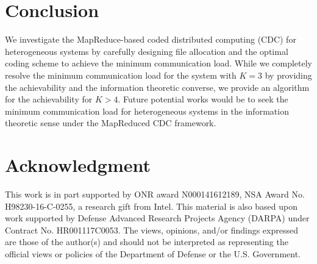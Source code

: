 \documentclass[conference]{IEEEtran}
\begin{document}
\section{Conclusion}

We investigate the MapReduce-based coded distributed computing (CDC) for heterogeneous systems by carefully designing file allocation and the optimal coding scheme to achieve the minimum communication load. While we completely resolve the minimum communication load for the system with $K=3$ by providing the achievability and the information theoretic converse, we provide an algorithm for the achievability for $K>4$. Future potential works would be to seek the minimum communication load for heterogeneous systems in the information theoretic sense under the MapReduced CDC framework.



\section{Acknowledgment}

This work is in part supported by ONR award N000141612189, NSA Award No. H98230-16-C-0255, a research gift from Intel. This material is also based upon work supported by Defense Advanced Research Projects Agency (DARPA) under Contract No. HR001117C0053. The views, opinions, and/or findings expressed are those of the author(s) and should not be interpreted as representing the official views or policies of the Department of Defense or the U.S. Government.
\end{document}
